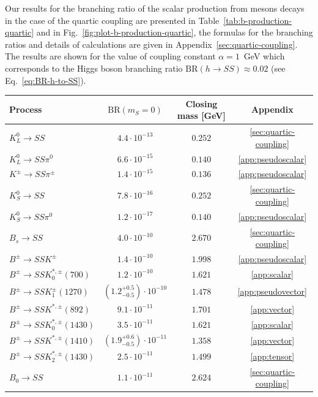\documentclass[a4paper,12pt,dvipsnames,usernames]{article}
\begin{document}
Our results for the branching ratio of the scalar production from mesons decays in the case of the quartic coupling are presented in Table~\ref{tab:b-production-quartic} and in  Fig.~\ref{fig:plot-b-production-quartic}, the formulas for the branching ratios and details of calculations are given in Appendix~\ref{sec:quartic-coupling}. The results are shown for the value of coupling constant $\alpha = 1$~GeV which corresponds to the Higgs boson branching ratio $\text{BR}(h\to SS) \approx 0.02$ (see Eq.~\eqref{eq:BR-h-to-SS}).
\begin{table}[t!]
\centering
\begin{tabular}{|l|c|c|c|}
 \hline  
 Process  & $\text{BR}(m_S=0)$& Closing mass [GeV] & Appendix \\
 \hline
 $K^0_L\to SS$ & $4.4\cdot 10^{-13}$ & $0.252$ & \ref{sec:quartic-coupling} \\ \hline
 $K^0_L\to SS\pi^0$ & $6.6\cdot 10^{-15}$ & $0.140$ & \ref{app:pseudoscalar} \\ \hline
 $K^\pm\to SS\pi^{\pm}$ & $1.4\cdot 10^{-15}$ & $0.136$ & \ref{app:pseudoscalar}\\ \hline
 $K^{0}_{S}\to SS$ & $7.8\cdot 10^{-16}$ & $0.252$ & \ref{sec:quartic-coupling} \\ \hline
 $K^0_S\to SS\pi^0$ & $1.2\cdot 10^{-17}$ & $0.140$ & \ref{app:pseudoscalar}\\ \hline
  $B_{s}\to SS$ & $4.0\cdot 10^{-10}$ & $2.670$ & \ref{sec:quartic-coupling} \\ \hline
 $B^{\pm} \to SS K^{\pm}$ & $1.4\cdot 10^{-10}$ & $1.998$ &\ref{app:pseudoscalar} \\ \hline
 $B^{\pm} \to SS K^{*,\pm}_{0}(700)$ & $1.2\cdot 10^{-10}$ & $1.621$ &\ref{app:scalar}\\ \hline
    $B^{\pm} \to SS K^{\pm}_{1}(1270)$ & $(1.2^{+0.5}_{-0.5})\cdot 10^{-10}$ & $1.478$ & \ref{app:pseudovector}\\ \hline
  $B^{\pm} \to SS K^{*,\pm}(892)$ & $9.1\cdot 10^{-11}$ & $1.701$ & \ref{app:vector}\\ \hline
  $B^{\pm} \to SS K^{*,\pm}_{0}(1430)$ & $3.5\cdot 10^{-11}$ & $1.621$ & \ref{app:scalar}\\ \hline
  $B^{\pm} \to SS K^{*,\pm}(1410)$ & $(1.9^{+0.6}_{-0.5})\cdot 10^{-11}$ & $1.358$ & \ref{app:vector}\\ \hline
  $B^{\pm} \to SS K^{*,\pm}_{2}(1430)$ & $2.5\cdot 10^{-11}$ & $1.499$ & \ref{app:tensor}\\ \hline
  $B_{0}\to SS$ & $1.1\cdot 10^{-11}$ & $2.624$ & \ref{sec:quartic-coupling}\\ \hline

\end{tabular}
\end{table}
\end{document}
